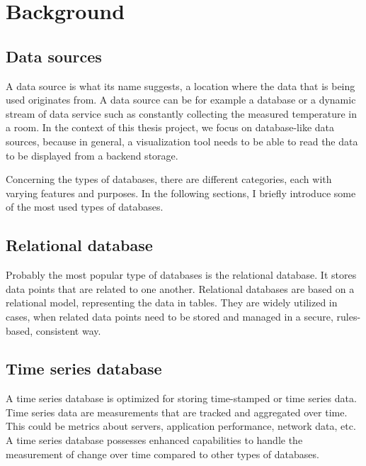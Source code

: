 \chapter{Background}

\section{Data sources}


A data source is what its name suggests, a location where the data that is being used originates from. A data source can be for example a database or a dynamic stream of data service such as constantly collecting the measured temperature in a room. In the context of this thesis project, we focus on database-like data sources, because in general, a visualization tool needs to be able to read the data to be displayed from a backend storage.

Concerning the types of databases, there are different categories, each with varying features and purposes. In the following sections, I briefly introduce some of the most used types of databases.

\section{Relational database}

Probably the most popular type of databases is the relational database. It stores data points that are related to one another. Relational databases are based on a relational model, representing the data in tables. They are widely utilized in cases, when related data points need to be stored and managed in a secure, rules-based, consistent way.

\section{Time series database}


A time series database is optimized for storing time-stamped or time series data. Time series data are measurements that are tracked and aggregated over time. This could be metrics about servers, application performance, network data, etc. A time series database possesses enhanced capabilities to handle the measurement of change over time compared to other types of databases.

